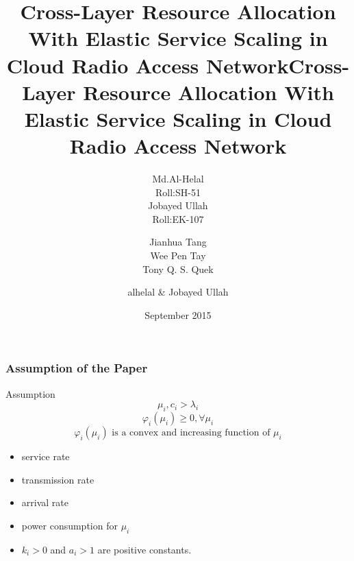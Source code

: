\documentclass[usenames,dvipsnames]{beamer}
\begin{document}
  \title{Cross-Layer  Resource  Allocation With  Elastic Service Scaling in Cloud Radio Access Network}
  \author[alhelal \& Jobayed Ullah]{
  \parbox{2.5cm}{
\centering Md.Al-Helal\\Roll:SH-51}\hspace{1cm}
\parbox{2.5cm}{
{\centering Jobayed Ullah\\Roll:EK-107}}
}
\begin{frame}
  \maketitle
\end{frame}
  \title{Cross-Layer  Resource  Allocation With  Elastic Service Scaling in Cloud Radio Access Network}
  \author{Jianhua Tang\\ Wee Pen Tay\\ Tony Q. S. Quek}
\date{September 2015}
\begin{frame}
  \maketitle
\end{frame}
  \author{alhelal \& Jobayed Ullah}
\begin{frame}
  \frametitle{Assumption of the Paper}
  \begin{exampleblock}{Assumption}
    \[
      \mu_{i},c_{i} > \lambda_{i}
    \]
    \[
      \varphi_{i}(\mu_{i})\geq 0, \forall \mu_{i}
    \]
    \[
      \varphi_{i}(\mu_{i}) \text{ is a convex and increasing function of } \mu_{i}
    \]
  \end{exampleblock}
  \begin{itemize}
    \item { service rate}
    \item { transmission rate}
    \item { arrival rate}
    \item { power consumption for $\mu_{i}$}
    \item $k_{i} > 0$ and $a_{i} > 1$ are positive constants.
  \end{itemize}
\end{frame}
\end{document}
